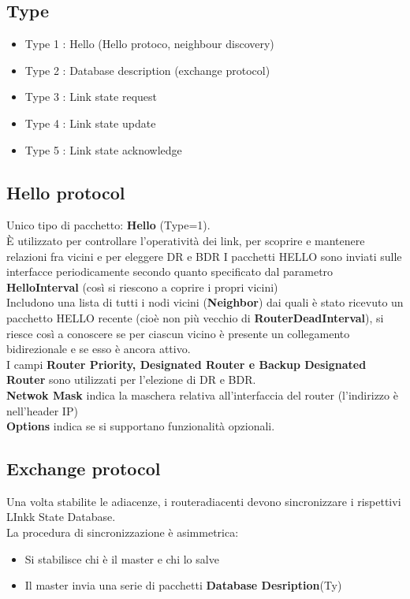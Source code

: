 \documentclass{report}
\begin{document}
            \subsection{Type}
                \begin{itemize}
                    \item Type 1 : Hello (Hello protoco,  neighbour discovery)
                    \item Type 2 : Database description (exchange protocol)
                    \item Type 3 : Link state request
                    \item Type 4 : Link state update 
                    \item Type 5 : Link state acknowledge
                \end{itemize}
            \subsection{Hello protocol}
                Unico tipo di pacchetto: \textbf{Hello} (Type=1).
                \\
                È utilizzato per controllare l'operatività dei link, per scoprire e mantenere relazioni fra vicini e per eleggere DR e BDR 
                I pacchetti HELLO sono inviati sulle interfacce periodicamente secondo quanto specificato dal parametro \textbf{HelloInterval} (così si riescono a coprire i propri vicini)
                \\
                Includono una lista di tutti i nodi vicini (\textbf{Neighbor}) dai quali è stato ricevuto un pacchetto HELLO recente (cioè non più vecchio di \textbf{RouterDeadInterval}), si riesce così a conoscere se per ciascun vicino è presente un
                collegamento bidirezionale e se esso è ancora attivo.
                \\
                I campi \textbf{Router Priority, Designated Router e Backup Designated Router} sono utilizzati per l'elezione di DR e BDR.
                \\
                \textbf{Netwok Mask} indica la maschera relativa all'interfaccia del router (l'indirizzo è nell'header IP)
                \\
                \textbf{Options} indica se si supportano funzionalità opzionali.
            \subsection{Exchange protocol}
                Una volta stabilite le adiacenze, i routeradiacenti devono sincronizzare i rispettivi LInkk State Database.
                \\
                La procedura di sincronizzazione è asimmetrica:
                \begin{itemize}
                    \item Si stabilisce chi è il master e chi lo salve 
                    \item Il master invia una serie di pacchetti \textbf{Database Desription}(Ty)
                \end{itemize}
\end{document}
